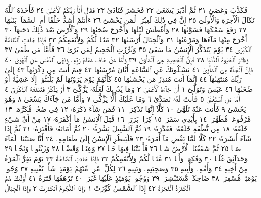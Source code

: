 فَكَذَّبَ وَعَصَىٰ ٢١ ثُمَّ أَدْبَرَ يَسْعَىٰ ٢٢ فَحَشَرَ فَنَادَىٰ ٢٣
فَقَالَ أَنَا۠ رَبُّكُمُ ٱلْأَعْلَىٰ ٢٤ فَأَخَذَهُ ٱللَّهُ نَكَالَ ٱلْأٓخِرَةِ وَٱلْأُولَىٰٓ ٢٥
إِنَّ فِي ذَٰلِكَ لَعِبْرَةࣰ لِّمَن يَخْشَىٰٓ ٢٦ ءَأَنتُمْ أَشَدُّ خَلْقًا أَمِ ٱلسَّمَآءُۚ
بَنَىٰهَا ٢٧ رَفَعَ سَمْكَهَا فَسَوَّىٰهَا ٢٨ وَأَغْطَشَ لَيْلَهَا وَأَخْرَجَ
ضُحَىٰهَا ٢٩ وَٱلْأَرْضَ بَعْدَ ذَٰلِكَ دَحَىٰهَآ ٣٠ أَخْرَجَ مِنْهَا مَآءَهَا
وَمَرْعَىٰهَا ٣١ وَٱلْجِبَالَ أَرْسَىٰهَا ٣٢ مَتَٰعࣰا لَّكُمْ وَلِأَنْعَٰمِكُمْ ٣٣
فَإِذَا جَآءَتِ ٱلطَّآمَّةُ ٱلْكُبْرَىٰ ٣٤ يَوْمَ يَتَذَكَّرُ ٱلْإِنسَٰنُ مَا سَعَىٰ ٣٥
وَبُرِّزَتِ ٱلْجَحِيمُ لِمَن يَرَىٰ ٣٦ فَأَمَّا مَن طَغَىٰ ٣٧ وَءَاثَرَ ٱلْحَيَوٰةَ
ٱلدُّنْيَا ٣٨ فَإِنَّ ٱلْجَحِيمَ هِيَ ٱلْمَأْوَىٰ ٣٩ وَأَمَّا مَنْ خَافَ مَقَامَ
رَبِّهِۦ وَنَهَى ٱلنَّفْسَ عَنِ ٱلْهَوَىٰ ٤٠ فَإِنَّ ٱلْجَنَّةَ هِيَ ٱلْمَأْوَىٰ ٤١
يَسْـَٔلُونَكَ عَنِ ٱلسَّاعَةِ أَيَّانَ مُرْسَىٰهَا ٤٢ فِيمَ أَنتَ مِن
ذِكْرَىٰهَآ ٤٣ إِلَىٰ رَبِّكَ مُنتَهَىٰهَآ ٤٤ إِنَّمَآ أَنتَ مُنذِرُ مَن يَخْشَىٰهَا ٤٥
كَأَنَّهُمْ يَوْمَ يَرَوْنَهَا لَمْ يَلْبَثُوٓا۟ إِلَّا عَشِيَّةً أَوْ ضُحَىٰهَا ٤٦
عَبَسَ وَتَوَلَّىٰٓ ١ أَن جَآءَهُ ٱلْأَعْمَىٰ ٢ وَمَا يُدْرِيكَ لَعَلَّهُۥ يَزَّكَّىٰٓ ٣ أَوْ يَذَّكَّرُ
فَتَنفَعَهُ ٱلذِّكْرَىٰٓ ٤ أَمَّا مَنِ ٱسْتَغْنَىٰ ٥ فَأَنتَ لَهُۥ تَصَدَّىٰ ٦ وَمَا عَلَيْكَ
أَلَّا يَزَّكَّىٰ ٧ وَأَمَّا مَن جَآءَكَ يَسْعَىٰ ٨ وَهُوَ يَخْشَىٰ ٩ فَأَنتَ عَنْهُ تَلَهَّىٰ ١٠
كَلَّآ إِنَّهَا تَذْكِرَةࣱ ١١ فَمَن شَآءَ ذَكَرَهُۥ ١٢ فِي صُحُفࣲ مُّكَرَّمَةࣲ ١٣ مَّرْفُوعَةࣲ
مُّطَهَّرَةِۭ ١٤ بِأَيْدِي سَفَرَةࣲ ١٥ كِرَامِۭ بَرَرَةࣲ ١٦ قُتِلَ ٱلْإِنسَٰنُ مَآ أَكْفَرَهُۥ ١٧ مِنْ
أَيِّ شَيْءٍ خَلَقَهُۥ ١٨ مِن نُّطْفَةٍ خَلَقَهُۥ فَقَدَّرَهُۥ ١٩ ثُمَّ ٱلسَّبِيلَ يَسَّرَهُۥ ٢٠
ثُمَّ أَمَاتَهُۥ فَأَقْبَرَهُۥ ٢١ ثُمَّ إِذَا شَآءَ أَنشَرَهُۥ ٢٢ كَلَّا لَمَّا يَقْضِ مَآ أَمَرَهُۥ ٢٣
فَلْيَنظُرِ ٱلْإِنسَٰنُ إِلَىٰ طَعَامِهِۦٓ ٢٤ أَنَّا صَبَبْنَا ٱلْمَآءَ صَبࣰّا ٢٥ ثُمَّ شَقَقْنَا
ٱلْأَرْضَ شَقࣰّا ٢٦ فَأَنۢبَتْنَا فِيهَا حَبࣰّا ٢٧ وَعِنَبࣰا وَقَضْبࣰا ٢٨ وَزَيْتُونࣰا وَنَخْلࣰا ٢٩
وَحَدَآئِقَ غُلْبࣰا ٣٠ وَفَٰكِهَةࣰ وَأَبࣰّا ٣١ مَّتَٰعࣰا لَّكُمْ وَلِأَنْعَٰمِكُمْ ٣٢ فَإِذَا جَآءَتِ
ٱلصَّآخَّةُ ٣٣ يَوْمَ يَفِرُّ ٱلْمَرْءُ مِنْ أَخِيهِ ٣٤ وَأُمِّهِۦ وَأَبِيهِ ٣٥ وَصَٰحِبَتِهِۦ
وَبَنِيهِ ٣٦ لِكُلِّ ٱمْرِئࣲ مِّنْهُمْ يَوْمَئِذࣲ شَأْنࣱ يُغْنِيهِ ٣٧ وُجُوهࣱ يَوْمَئِذࣲ
مُّسْفِرَةࣱ ٣٨ ضَاحِكَةࣱ مُّسْتَبْشِرَةࣱ ٣٩ وَوُجُوهࣱ يَوْمَئِذٍ عَلَيْهَا غَبَرَةࣱ ٤٠
تَرْهَقُهَا قَتَرَةٌ ٤١ أُو۟لَٰٓئِكَ هُمُ ٱلْكَفَرَةُ ٱلْفَجَرَةُ ٤٢
إِذَا ٱلشَّمْسُ كُوِّرَتْ ١ وَإِذَا ٱلنُّجُومُ ٱنكَدَرَتْ ٢ وَإِذَا ٱلْجِبَالُ
